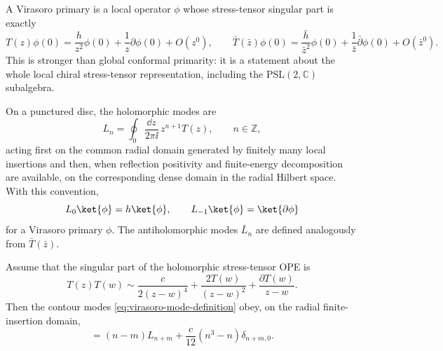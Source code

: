 \begin{definition}
\label{def:virasoro-primary-and-contour-modes}
A Virasoro primary is a local operator \(\phi\) whose stress-tensor singular
part is exactly
\begin{equation}
  T(z)\phi(0)
  =
  \frac{h}{z^2}\phi(0)
  +
  \frac1z\partial\phi(0)
  +O(z^0),
  \qquad
  \bar T(\bar z)\phi(0)
  =
  \frac{\bar h}{\bar z^2}\phi(0)
  +
  \frac1{\bar z}\bar\partial\phi(0)
  +O(\bar z^0).
  \label{eq:virasoro-primary-stress-ope}
\end{equation}
This is stronger than global conformal primarity: it is a statement about the
whole local chiral stress-tensor representation, including the
\(\mathrm{PSL}(2,\mathbb C)\) subalgebra.

On a punctured disc, the holomorphic modes are
\begin{equation}
  L_n
  =
  \oint_0\frac{\dd z}{2\pi\ii}\,z^{n+1}T(z),
  \qquad n\in\mathbb Z,
  \label{eq:virasoro-mode-definition}
\end{equation}
acting first on the common radial domain generated by finitely many local
insertions and then, when reflection positivity and finite-energy
decomposition are available, on the corresponding dense domain in the radial
Hilbert space.  With this convention,
\[
  L_0\ket{\phi}=h\ket{\phi},\qquad
  L_{-1}\ket{\phi}=\ket{\partial\phi}
\]
for a Virasoro primary \(\phi\).  The antiholomorphic modes \(\bar L_n\) are
defined analogously from \(\bar T(\bar z)\).
\end{definition}

\begin{lemma}
\label{lem:tt-ope-virasoro-algebra}
Assume that the singular part of the holomorphic stress-tensor OPE is
\begin{equation}
  T(z)T(w)
  \sim
  \frac{c}{2(z-w)^4}
  +
  \frac{2T(w)}{(z-w)^2}
  +
  \frac{\partial T(w)}{z-w}.
  \label{eq:stress-tensor-tt-ope}
\end{equation}
Then the contour modes \eqref{eq:virasoro-mode-definition} obey, on the
radial finite-insertion domain,
\begin{equation}
  [L_n,L_m]
  =
  (n-m)L_{n+m}
  +
  \frac{c}{12}(n^3-n)\delta_{n+m,0}.
  \label{eq:virasoro-algebra-from-tt-ope}
\end{equation}
\end{lemma}

